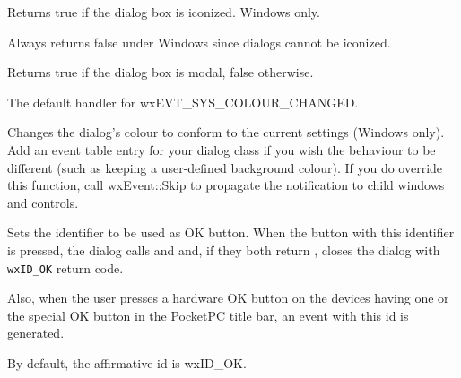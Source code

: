 
Returns true if the dialog box is iconized. Windows only.


Always returns false under Windows since dialogs cannot be iconized.


\label{wxdialogismodal}


Returns true if the dialog box is modal, false otherwise.



\label{wxdialogonsyscolourchanged}


The default handler for wxEVT\_SYS\_COLOUR\_CHANGED.




Changes the dialog's colour to conform to the current settings (Windows only).
Add an event table entry for your dialog class if you wish the behaviour
to be different (such as keeping a user-defined
background colour). If you do override this function, call wxEvent::Skip to
propagate the notification to child windows and controls.




\label{wxdialogsetaffirmativeid}


Sets the identifier to be used as OK button. When the button with this
identifier is pressed, the dialog calls  
and  
and, if they both return \true, closes the dialog with \texttt{wxID\_OK} return
code.

Also, when the user presses a hardware OK button on the devices having one or
the special OK button in the PocketPC title bar, an event with this id is
generated.

By default, the affirmative id is wxID\_OK.


